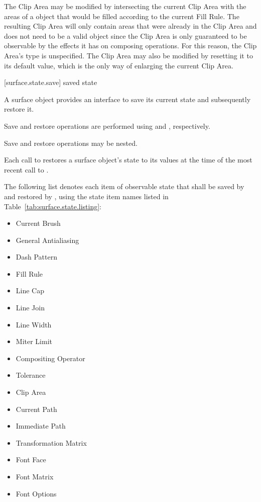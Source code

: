 \pnum
\enternote
The Clip Area may be modified by intersecting the current Clip Area with the areas of a  object that would be filled according to the current Fill Rule. The resulting Clip Area will only contain areas that were already in the Clip Area and does not need to be a valid  object since the Clip Area is only guaranteed to be observable by the effects it has on composing operations. For this reason, the Clip Area's type is unspecified. The Clip Area may also be modified by resetting it to its default value, which is the only way of enlarging the current Clip Area.
\exitnote

 [surface.state.save] { saved state}

\pnum
A surface object provides an interface to save its current state and subsequently restore it.

\pnum
Save and restore operations are performed using  and , respectively.

\pnum
Save and restore operations may be nested.

\pnum
Each call to  restores a surface object's state to its values at the time of the most recent call to .

\pnum
The following list denotes each item of observable state that shall be saved by  and restored by , using the state item names listed in Table~\ref{tab:surface.state.listing}:

\begin{itemize}
	\item Current Brush
	\item General Antialiasing
	\item Dash Pattern
	\item Fill Rule
	\item Line Cap
	\item Line Join
	\item Line Width
	\item Miter Limit
	\item Compositing Operator
	\item Tolerance
	\item Clip Area
	\item Current Path
	\item Immediate Path
	\item Transformation Matrix
	\item Font Face
	\item Font Matrix
	\item Font Options
\end{itemize}


